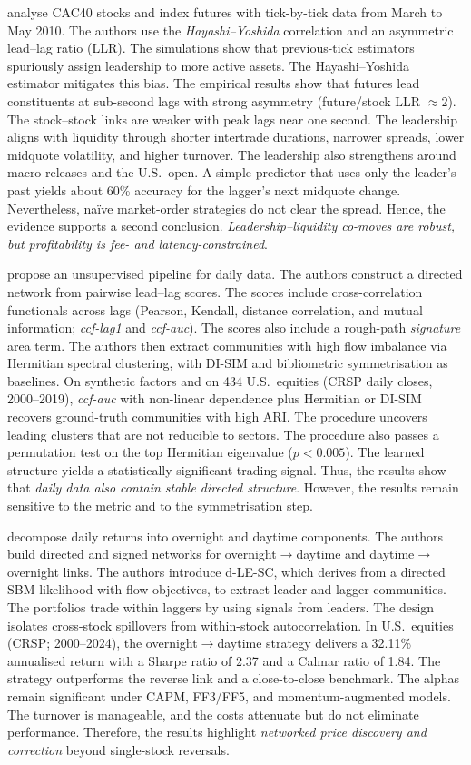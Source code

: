 \cite{huth2012leadlag} analyse CAC40 stocks and index futures with tick-by-tick data from March to May 2010. The authors use the \emph{Hayashi--Yoshida} correlation and an asymmetric lead--lag ratio (LLR). The simulations show that previous-tick estimators spuriously assign leadership to more active assets. The Hayashi--Yoshida estimator mitigates this bias. The empirical results show that futures lead constituents at sub-second lags with strong asymmetry (future/stock LLR $\approx 2$). The stock--stock links are weaker with peak lags near one second. The leadership aligns with liquidity through shorter intertrade durations, narrower spreads, lower midquote volatility, and higher turnover. The leadership also strengthens around macro releases and the U.S.\ open. A simple predictor that uses only the leader’s past yields about 60\% accuracy for the lagger’s next midquote change. Nevertheless, naïve market-order strategies do not clear the spread. Hence, the evidence supports a second conclusion. \emph{Leadership--liquidity co-moves are robust, but profitability is fee- and latency-constrained}.

\cite{bennett2022leadlag} propose an unsupervised pipeline for daily data. The authors construct a directed network from pairwise lead--lag scores. The scores include cross-correlation functionals across lags (Pearson, Kendall, distance correlation, and mutual information; \emph{ccf-lag1} and \emph{ccf-auc}). The scores also include a rough-path \emph{signature} area term. The authors then extract communities with high flow imbalance via Hermitian spectral clustering, with DI-SIM and bibliometric symmetrisation as baselines. On synthetic factors and on 434 U.S.\ equities (CRSP daily closes, 2000--2019), \emph{ccf-auc} with non-linear dependence plus Hermitian or DI-SIM recovers ground-truth communities with high ARI. The procedure uncovers leading clusters that are not reducible to sectors. The procedure also passes a permutation test on the top Hermitian eigenvalue ($p<0.005$). The learned structure yields a statistically significant trading signal. Thus, the results show that \emph{daily data also contain stable directed structure}. However, the results remain sensitive to the metric and to the symmetrisation step.

\cite{lu2025tugofwar} decompose daily returns into overnight and daytime components. The authors build directed and signed networks for overnight$\to$daytime and daytime$\to$overnight links. The authors introduce d-LE-SC, which derives from a directed SBM likelihood with flow objectives, to extract leader and lagger communities. The portfolios trade within laggers by using signals from leaders. The design isolates cross-stock spillovers from within-stock autocorrelation. In U.S.\ equities (CRSP; 2000--2024), the overnight$\to$daytime strategy delivers a 32.11\% annualised return with a Sharpe ratio of 2.37 and a Calmar ratio of 1.84. The strategy outperforms the reverse link and a close-to-close benchmark. The alphas remain significant under CAPM, FF3/FF5, and momentum-augmented models. The turnover is manageable, and the costs attenuate but do not eliminate performance. Therefore, the results highlight \emph{networked price discovery and correction} beyond single-stock reversals.

